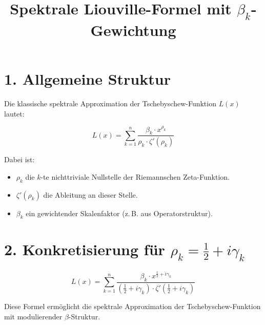 \documentclass{article}
\title{Spektrale Liouville-Formel mit \(\beta_k\)-Gewichtung}
\author{}
\date{}
\begin{document}
\maketitle

\section*{1. Allgemeine Struktur}

Die klassische spektrale Approximation der Tschebyschew-Funktion \(L(x)\) lautet:

\begin{equation}
L(x) = \sum_{k=1}^{n} \frac{\beta_k \cdot x^{\rho_k}}{\rho_k \cdot \zeta'(\rho_k)}
\end{equation}

Dabei ist:
\begin{itemize}
  \item \(\rho_k\) die \(k\)-te nichttriviale Nullstelle der Riemannschen Zeta-Funktion.
  \item \(\zeta'(\rho_k)\) die Ableitung an dieser Stelle.
  \item \(\beta_k\) ein gewichtender Skalenfaktor (z.\,B. aus Operatorstruktur).
\end{itemize}

\section*{2. Konkretisierung für \(\rho_k = \tfrac{1}{2} + i \gamma_k\)}

\begin{equation}
L(x) = \sum_{k=1}^{n} \frac{\beta_k \cdot x^{\frac{1}{2} + i\gamma_k}}{\left( \frac{1}{2} + i\gamma_k \right) \cdot \zeta'\left( \frac{1}{2} + i\gamma_k \right)}
\end{equation}

Diese Formel ermöglicht die spektrale Approximation der Tschebyschew-Funktion mit modulierender \(\beta\)-Struktur.
\end{document}
